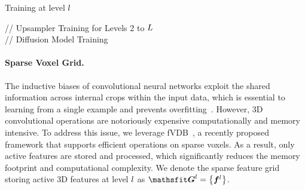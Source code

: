 \begin{algorithm}[t]
    \caption{Training at level \(l\)}
    \label{alg:forward-diffusion}
    // Upsampler Training for Levels 2 to $L$\\
    // Diffusion Model Training\\
\end{algorithm}

\paragraph{Sparse Voxel Grid.}
The inductive biases of convolutional neural networks exploit the shared information across internal crops within the input data, which is essential to learning from a single example and prevents overfitting~\cite{shaham2019singan,nikankin2023sinfusion,kulikov2023sinddm}.
However, 3D convolutional operations are notoriously expensive computationally and memory intensive.
To address this issue, we leverage fVDB~\cite{williams2024fvdb}, a recently proposed framework that supports efficient operations on sparse voxels. 
As a result, only active features are stored and processed, which significantly reduces the memory footprint and computational complexity.
We denote the sparse feature grid storing active 3D features at level \(l\) as \(\grid^{\lvl} = \left\{ \feat^{\lvl} \right\}\).

